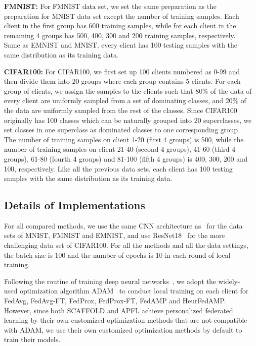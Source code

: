 \textbf{FMNIST:} 
For FMNIST data set, we set the same preparation as the preparation for MNIST data set except the number of training samples.
Each client in the first group has 600 training samples, while for each client in the remaining 4 groups has 500, 400, 300 and 200 training samples, respectively.
Same as EMNIST and MNIST, every client has 100 testing samples with the same distribution as its training data.




\textbf{CIFAR100:}
For CIFAR100, we first set up 100 clients numbered as 0-99 and then divide them into 20 groups where each group contains 5 clients. For each group of clients, we assign the samples to the clients such that 80\% of the data of every client are uniformly sampled from a set of dominating classes, and 20\% of the data are uniformly sampled from the rest of the classes. Since CIFAR100 originally has 100 classes which can be naturally grouped into 20 superclasses, we set classes in one superclass as dominated classes to one corresponding group. The number of training samples on client 1-20 (first 4 groups) is 500, while the number of training samples on client 21-40 (second 4 groups), 41-60 (third 4 groups), 61-80 (fourth 4 groups) and 81-100 (fifth 4 groups) is 400, 300, 200 and 100, respectively.
Like all the previous data sets, each client has 100 testing samples with the same distribution as its training data.

\subsection{Details of Implementations}
For all compared methods, we use the same CNN architecture as~\cite{mcmahan2016communication}
for the data sets of MNIST, FMNIST and EMNIST, and use ResNet18~\cite{He_2016_CVPR} for the more challenging data set of CIFAR100.
For all the methods and all the data settings, the batch size is $100$ and the number of epochs is $10$ in each round of local training. 


Following the routine of training deep neural networks~\cite{kingma2014adam, reddi2018convergence, zhang2019adam}, we adopt the widely-used optimization algorithm ADAM~\cite{kingma2014adam} to conduct local training on each client for FedAvg, FedAvg-FT, FedProx, FedProx-FT, {FedAMP} and {HeurFedAMP}.
However, since both SCAFFOLD and APFL achieve personalized federated learning by their own customized optimization methods that are not compatible with ADAM, we use their own customized optimization methods by default to train their models.

